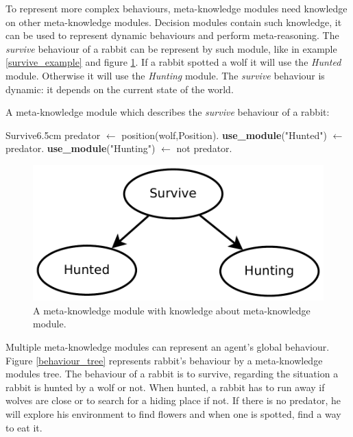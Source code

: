 \documentclass{aamas2012}
\begin{document}
	To represent more complex behaviours, meta-knowledge modules need knowledge on other meta-knowledge modules.
	Decision modules contain such knowledge, it can be used to represent dynamic behaviours and perform meta-reasoning.
	The \emph{survive} behaviour of a rabbit can be represent by such module, like in example \ref{survive_example} and figure \ref{survive_figure}.
	If a rabbit spotted a wolf it will use the \emph{Hunted} module. Otherwise it will use the \emph{Hunting} module.
	The \emph{survive} behaviour is dynamic: it depends on the current state of the world.
	
	\begin{example}
		\label{survive_example}
		A meta-knowledge module which describes the \emph{survive} behaviour of a rabbit:\newline
		\begin{module}{Survive}{6.5cm}
			predator $\leftarrow$ position(wolf,Position).\newline
			\textbf{use\_module}("Hunted") $\leftarrow$ predator.\newline
			\textbf{use\_module}("Hunting") $\leftarrow$ not predator.
		\end{module}
	\end{example}
	
	\begin{figure}
		\centering
		\includegraphics[keepaspectratio=true, scale=0.4]{survive.pdf}
		\caption
		{
			\label{survive_figure}
			A meta-knowledge module with knowledge about meta-knowledge module.
		}
	\end{figure}
	
	Multiple meta-knowledge modules can represent an agent's global behaviour.
	Figure \ref{behaviour_tree} represents rabbit's behaviour by a meta-knowledge modules tree.
	The behaviour of a rabbit is to survive, regarding the situation a rabbit is hunted by a wolf or not.
	When hunted, a rabbit has to run away if wolves are close or to search for a hiding place if not.
	If there is no predator, he will explore his environment to find flowers and when one is spotted, find a way to eat it.
	
\end{document}
